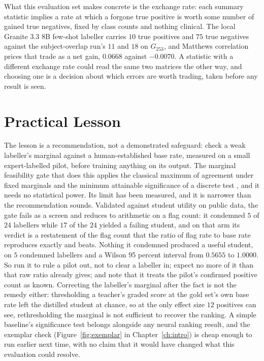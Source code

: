 What this evaluation set makes concrete is the exchange rate: each summary statistic implies
a rate at which a forgone true positive is worth some number of gained true negatives, fixed
by class counts and nothing clinical. The local Granite 3.3 8B few-shot labeller carries $10$ true positives
and $75$ true negatives against the subject-overlap run's $11$ and $18$ on
$G_{253}$, and Matthews correlation prices that trade as a net gain, $0.0668$
against $-0.0070$. A statistic with a different exchange rate could read the same
two matrices the other way, and choosing one is a decision about which errors are
worth trading, taken before any result is seen.

\section{Practical Lesson}
\label{sec:conc-practice}

The lesson is a recommendation, not a demonstrated safeguard: check a weak labeller's marginal
against a human-established base rate, measured on a small expert-labelled pilot, before
training anything on its output. The marginal feasibility gate that does this applies the
classical maximum of agreement under fixed marginals and the minimum attainable
significance of a discrete test \citep{cohen1960kappa,tarone1990modified}, and it
needs no statistical power. Its limit has been measured, and it is narrower than the
recommendation sounds. Validated against student utility on public data, the gate fails as a
screen and reduces to arithmetic on a flag count: it condemned $5$ of $24$ labellers while
$17$ of the $24$ yielded a failing student, and on that arm its verdict is a restatement of
the flag count that the ratio of flag rate to base rate reproduces exactly and beats. Nothing
it condemned produced a useful student, on $5$ condemned labellers and a Wilson 95 percent
interval from $0.5655$ to $1.0000$. So run it to rule a pilot out, not to clear a labeller in;
expect no more of it than that raw ratio already gives; and note that it treats the pilot's
confirmed positive count as known. Correcting the labeller's marginal after the fact is not the remedy either:
thresholding a teacher's graded score at the gold set's own base rate left the distilled
student at chance, so at the only effect size $12$ positives can see, rethresholding the
marginal is not sufficient to recover the ranking. A simple baseline's significance test belongs alongside any neural ranking result, and the
exemplar check (Figure~\ref{fig:exemplar} in Chapter~\ref{ch:intro}) is cheap enough to run
earlier next time, with no claim that it would have changed what this evaluation could
resolve.


